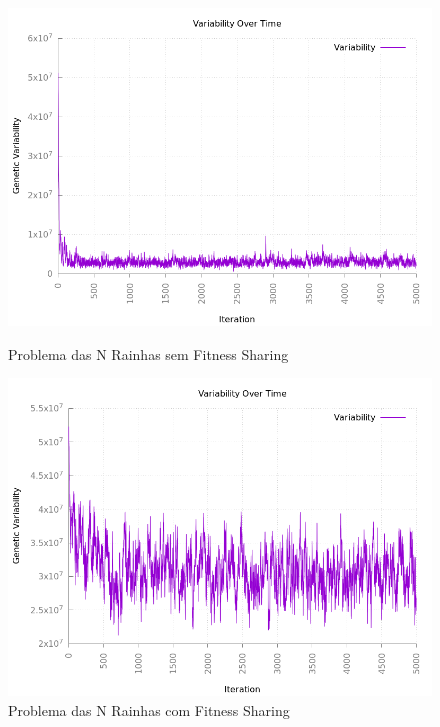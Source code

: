 \documentclass[12pt]{article}
\begin{document}
\begin{figure}[h!]
    \centering
    \begin{minipage}{0.47\textwidth}
        \centering
        \includegraphics[width=\textwidth]{pictures/queensvarscalingoff}
        \caption{Problema das N Rainhas sem Fitness Sharing}
        \label{f310}
    \end{minipage}
    \begin{minipage}{0.47\textwidth}
        \centering
        \includegraphics[width=\textwidth]{pictures/64queensvariabilitysharing}
        \caption{Problema das N Rainhas com Fitness Sharing}
        \label{sharing}
    \end{minipage}
\end{figure}
\end{document}
